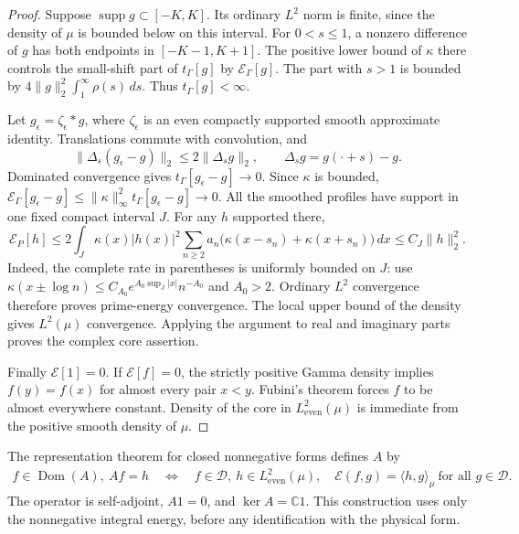 \documentclass[11pt,a4paper]{article}
\numberwithin{equation}{section}
\theoremstyle{definition}
\theoremstyle{remark}
\newcommand{\C}{\mathbb C}
\newcommand{\E}{\mathcal E}
\newcommand{\D}{\mathcal D}
\newcommand{\He}{L^2_{\mathrm{even}}(\mu)}
\newcommand{\tg}{t_{\Gamma}}
\newcommand{\dom}{\operatorname{Dom}}
\newcommand{\supp}{\operatorname{supp}}
\newcommand{\ip}[2]{\langle #1,#2\rangle}
\newcommand{\norm}[1]{\lVert #1\rVert}
\begin{document}
\begin{proof}
Suppose $\supp g\subset[-K,K]$. Its ordinary $L^2$ norm is finite, since the density of $\mu$ is bounded below on this interval. For $0<s\le1$, a nonzero difference of $g$ has both endpoints in $[-K-1,K+1]$. The positive lower bound of $\kappa$ there controls the small-shift part of $\tg[g]$ by $\E_\Gamma[g]$. The part with $s>1$ is bounded by $4\norm{g}_2^2\int_1^\infty\rho(s)\,ds$. Thus $\tg[g]<\infty$.

Let $g_\epsilon=\zeta_\epsilon*g$, where $\zeta_\epsilon$ is an even compactly supported smooth approximate identity. Translations commute with convolution, and
\[
 \norm{\Delta_s(g_\epsilon-g)}_2\le2\norm{\Delta_sg}_2,
 \qquad\Delta_sg=g(\cdot+s)-g.
\]
Dominated convergence gives $\tg[g_\epsilon-g]\to0$. Since $\kappa$ is bounded,
$\E_\Gamma[g_\epsilon-g]\le\norm{\kappa}_\infty^2\tg[g_\epsilon-g]\to0$.
All the smoothed profiles have support in one fixed compact interval $J$. For any $h$ supported there,
\begin{equation}\label{eq:compactprimerate}
 \E_P[h]\le2\int_J\kappa(x)|h(x)|^2
     \sum_{n\ge2}a_n\bigl(\kappa(x-s_n)+\kappa(x+s_n)\bigr)\,dx
 \le C_J\norm{h}_2^2.
\end{equation}
Indeed, the complete rate in parentheses is uniformly bounded on $J$: use $\kappa(x\pm\log n)\le C_{A_0}e^{A_0\sup_J|x|}n^{-A_0}$ and $A_0>2$. Ordinary $L^2$ convergence therefore proves prime-energy convergence. The local upper bound of the density gives $L^2(\mu)$ convergence. Applying the argument to real and imaginary parts proves the complex core assertion.

Finally $\E[1]=0$. If $\E[f]=0$, the strictly positive Gamma density implies $f(y)=f(x)$ for almost every pair $x<y$. Fubini's theorem forces $f$ to be almost everywhere constant. Density of the core in $\He$ is immediate from the positive smooth density of $\mu$.
\end{proof}

The representation theorem for closed nonnegative forms \cite[Chapter~VI, Section~2]{Kato} defines $A$ by
\begin{equation}\label{eq:Adef}
 \begin{split}
 f\in\dom(A),\ Af=h\quad\Longleftrightarrow\quad
 f\in\D,\ h\in\He,\quad
 \E(f,g)=\ip{h}{g}_\mu\ \text{for all }g\in\D.
 \end{split}
\end{equation}
The operator is self-adjoint, $A1=0$, and $\ker A=\C1$. This construction uses only the nonnegative integral energy, before any identification with the physical form.
\end{document}
